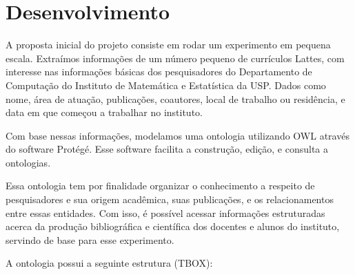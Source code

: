 \chapter{Desenvolvimento}
\label{cap:desenvolvimento}

A proposta inicial do projeto consiste em rodar um experimento em pequena escala. Extraímos informações de um número pequeno de currículos Lattes, com interesse nas informações básicas dos pesquisadores do Departamento de Computação do Instituto de Matemática e Estatística da USP. Dados como nome, área de atuação, publicações, coautores, local de trabalho ou residência, e data em que começou a trabalhar no instituto.

Com base nessas informações, modelamos uma ontologia utilizando OWL através do software Protégé. Esse software facilita a construção, edição, e consulta a ontologias.

Essa ontologia tem por finalidade organizar o conhecimento a respeito de pesquisadores e sua origem acadêmica, suas publicações, e os relacionamentos entre essas entidades. Com isso, é possível acessar informações estruturadas acerca da produção bibliográfica e científica dos docentes e alunos do instituto, servindo de base para esse experimento.


A ontologia possui a seguinte estrutura (TBOX):



